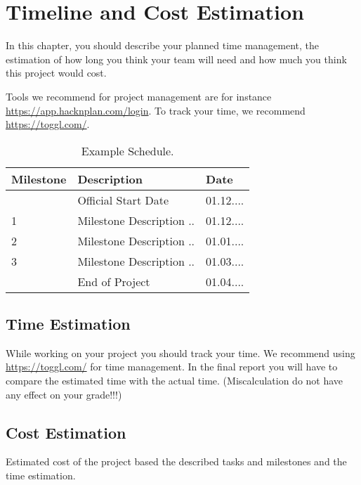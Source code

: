 
\chapter{Timeline and Cost Estimation}

In this chapter, you should describe your planned time management, the estimation of how long you think your team will need and how much you think this project would cost. 

Tools we recommend for project management are for instance \url{https://app.hacknplan.com/login}. To track your time, we recommend \url{https://toggl.com/}.  

\begin{table}[h]
\centering
\begin{tabular}{|l|l|l|}
\hline
Milestone & Description & Date \\\hline
& Official Start Date & 01.12.... \\
1 & Milestone Description ..  & 01.12.... \\
2 & Milestone Description ..  & 01.01.... \\
3 & Milestone Description ..  & 01.03.... \\
& End of Project & 01.04.... \\
\hline
\end{tabular}
\caption{\label{tab:schedule}Example Schedule.}
\end{table}

\section{Time Estimation}

While working on your project you should track your time. 
We recommend using \url{https://toggl.com/} for time management. In the final report you will have to compare the estimated time with the actual time. (Miscalculation do not have any effect on your grade!!!)

\section{Cost Estimation}

Estimated cost of the project based the described tasks and milestones and the  time estimation.  
